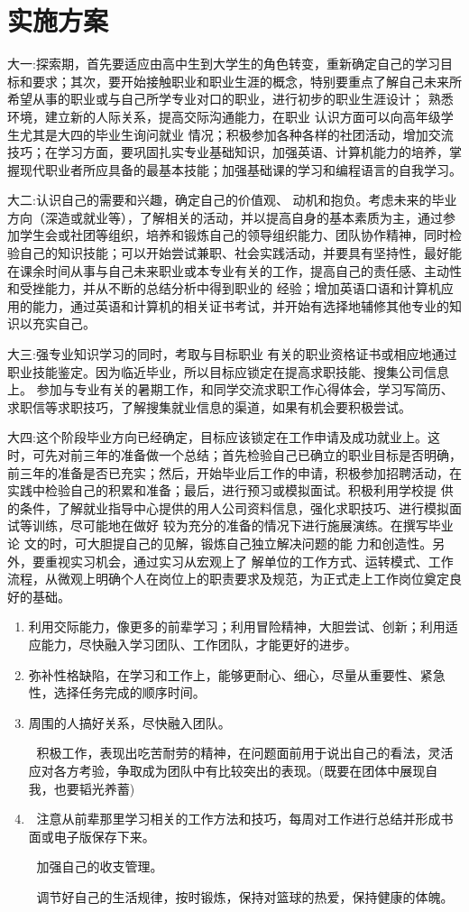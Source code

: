 \documentclass{article}
\begin{document}
\section{实施方案}
大一:探索期，首先要适应由高中生到大学生的角色转变，重新确定自己的学习目标和要求；其次，要开始接触职业和职业生涯的概念，特别要重点了解自己未来所希望从事的职业或与自己所学专业对口的职业，进行初步的职业生涯设计； 熟悉环境，建立新的人际关系，提高交际沟通能力，在职业 认识方面可以向高年级学生尤其是大四的毕业生询问就业 情况；积极参加各种各样的社团活动，增加交流技巧；在学习方面，要巩固扎实专业基础知识，加强英语、计算机能力的培养，掌握现代职业者所应具备的最基本技能；加强基础课的学习和编程语言的自我学习。\par
大二:认识自己的需要和兴趣，确定自己的价值观、 动机和抱负。考虑未来的毕业方向（深造或就业等），了解相关的活动，并以提高自身的基本素质为主，通过参加学生会或社团等组织，培养和锻炼自己的领导组织能力、团队协作精神，同时检验自己的知识技能；可以开始尝试兼职、社会实践活动，并要具有坚持性，最好能在课余时间从事与自己未来职业或本专业有关的工作，提高自己的责任感、主动性和受挫能力，并从不断的总结分析中得到职业的 经验；增加英语口语和计算机应用的能力，通过英语和计算机的相关证书考试，并开始有选择地辅修其他专业的知 识以充实自己。\par
大三:强专业知识学习的同时，考取与目标职业 有关的职业资格证书或相应地通过职业技能鉴定。因为临近毕业，所以目标应锁定在提高求职技能、搜集公司信息上。 参加与专业有关的暑期工作，和同学交流求职工作心得体会，学习写简历、求职信等求职技巧，了解搜集就业信息的渠道，如果有机会要积极尝试。\par
大四:这个阶段毕业方向已经确定，目标应该锁定在工作申请及成功就业上。这时，可先对前三年的准备做一个总结；首先检验自己已确立的职业目标是否明确，前三年的准备是否已充实；然后，开始毕业后工作的申请，积极参加招聘活动，在实践中检验自己的积累和准备；最后，进行预习或模拟面试。积极利用学校提 供的条件，了解就业指导中心提供的用人公司资料信息，强化求职技巧、进行模拟面试等训练，尽可能地在做好 较为充分的准备的情况下进行施展演练。在撰写毕业论 文的时，可大胆提自己的见解，锻炼自己独立解决问题的能 力和创造性。另外，要重视实习机会，通过实习从宏观上了 解单位的工作方式、运转模式、工作流程，从微观上明确个人在岗位上的职责要求及规范，为正式走上工作岗位奠定良好的基础。\par
\begin{enumerate}[1、]
	\item 利用交际能力，像更多的前辈学习；利用冒险精神，大胆尝试、创新；利用适应能力，尽快融入学习团队、工作团队，才能更好的进步。
	\item 弥补性格缺陷，在学习和工作上，能够更耐心、细心，尽量从重要性、紧急性，选择任务完成的顺序时间。
	\item 周围的人搞好关系，尽快融入团队。\par
		 积极工作，表现出吃苦耐劳的精神，在问题面前用于说出自己的看法，灵活应对各方考验，争取成为团队中有比较突出的表现。(既要在团体中展现自我，也要韬光养蓄)
	\item 
		注意从前辈那里学习相关的工作方法和技巧，每周对工作进行总结并形成书面或电子版保存下来。\par
		加强自己的收支管理。\par
		调节好自己的生活规律，按时锻炼，保持对篮球的热爱，保持健康的体魄。\par
		
\end{enumerate}
\end{document}
